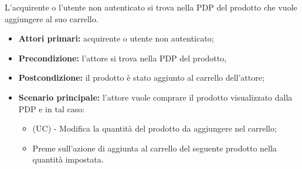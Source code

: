 L'acquirente o l'utente non autenticato si trova nella PDP del prodotto che vuole aggiungere al suo carrello.
\begin{itemize}
    \item \textbf{Attori primari:} acquirente o utente non autenticato;
    \item \textbf{Precondizione:} l'attore si trova nella PDP del prodotto,
    \item \textbf{Postcondizione:} il prodotto è stato aggiunto al carrello dell'attore;
    \item \textbf{Scenario principale:} l'attore vuole comprare il prodotto visualizzato dalla PDP e in tal caso:
    \begin{itemize}
        \item (UC) - Modifica la quantità del prodotto da aggiungere nel carrello;
        \item Preme sull'azione di aggiunta al carrello del seguente prodotto nella quantità impostata.
    \end{itemize}
\end{itemize}

